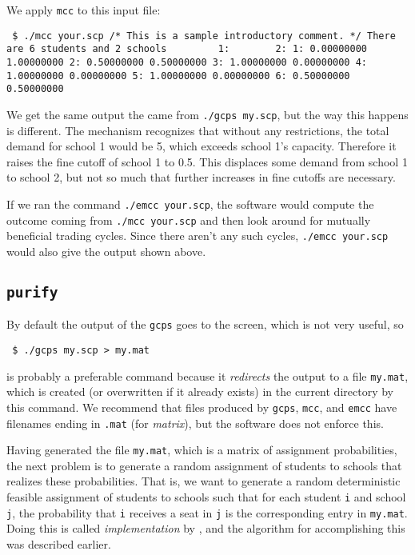 \documentclass[12pt]{article}
\theoremstyle{definition}
\begin{document}
We apply \texttt{mcc} to this input file:
\medskip
\begin{obeylines}\texttt{
    \$ ./mcc your.scp 
/* This is a sample introductory comment. */
There are 6 students and 2 schools
 \ \ \ \ \ \ \ \          1: \ \ \ \ \ \ \          2:
1:   0.00000000  1.00000000
2:   0.50000000  0.50000000
3:   1.00000000  0.00000000
4:   1.00000000  0.00000000
5:   1.00000000  0.00000000
6:   0.50000000  0.50000000
}
\end{obeylines} \noindent
We get the same output the came from \texttt{./gcps my.scp}, but the
way this happens is different.  The mechanism recognizes that without
any restrictions, the total demand for school 1 would be 5, which
exceeds school 1's capacity. Therefore it raises the fine cutoff of
school 1 to 0.5.  This displaces some demand from school 1 to school
2, but not so much that further increases in fine cutoffs are
necessary.

If we ran the command \texttt{./emcc your.scp}, the software would
compute the outcome coming from \texttt{./mcc your.scp} and then look
around for mutually beneficial trading cycles.  Since there aren't any
such cycles, \texttt{./emcc your.scp} would also give the output shown
above.

\subsection{\texttt{purify}} \label{subsec:Implementation} 

By default the output of the \texttt{gcps} goes to the screen, which
is not very useful, so 
\begin{obeylines}
  \texttt{
    \$ ./gcps my.scp > my.mat
    }
\end{obeylines}
\bigskip \noindent is probably a preferable command because it
\emph{redirects} the output to a file \texttt{my.mat}, which is
created (or overwritten if it already exists) in the current directory
by this command.  We recommend that files produced by \texttt{gcps},
\texttt{mcc}, and \texttt{emcc} have filenames ending in \texttt{.mat}
(for \emph{matrix}), but the software does not enforce this.

Having generated the file \texttt{my.mat}, which is a matrix of
assignment probabilities, the next problem is to generate a random
assignment of students to schools that realizes these probabilities.
That is, we want to generate a random deterministic feasible
assignment of students to schools such that for each student
\texttt{i} and school \texttt{j}, the probability that \texttt{i}
receives a seat in \texttt{j} is the corresponding entry in
\texttt{my.mat}.  Doing this is called \emph{implementation} by
\cite{bckm13aer}, and the algorithm for accomplishing this was
described earlier.
\end{document}
